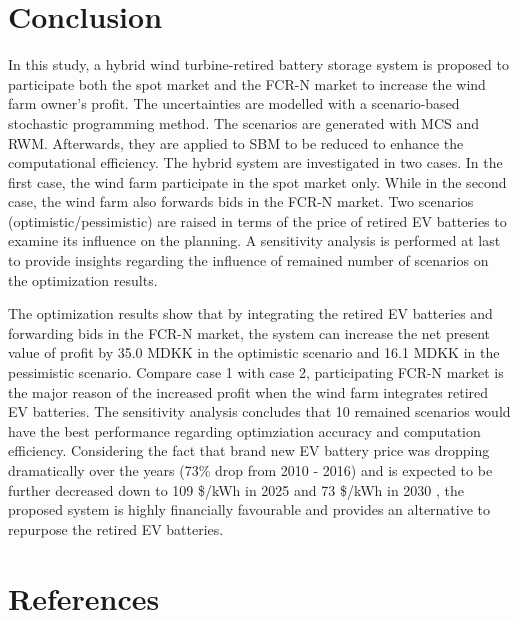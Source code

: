 \documentclass[final,5p,times,twocolumn,authoryear]{elsarticle}
\begin{document}
\section{Conclusion}
In this study, a hybrid wind turbine-retired battery storage system is proposed to participate both the spot market and the FCR-N market to increase the wind farm owner's profit. The uncertainties are modelled with a scenario-based stochastic programming method. The scenarios are generated with MCS and RWM. Afterwards, they are applied to SBM to be reduced to enhance the computational efficiency. The hybrid system are investigated in two cases. In the first case, the wind farm participate in the spot market only. While in the second case, the wind farm also forwards bids in the FCR-N market. Two scenarios (optimistic/pessimistic) are raised in terms of the price of retired EV batteries to examine its influence on the planning. A sensitivity analysis is performed at last to provide insights regarding the influence of remained number of scenarios on the optimization results.

The optimization results show that by integrating the retired EV batteries and forwarding bids in the FCR-N market, the system can increase the net present value of profit by 35.0 MDKK in the optimistic scenario and 16.1 MDKK in the pessimistic scenario. Compare case 1 with case 2, participating FCR-N market is the major reason of the increased profit when the wind farm integrates retired EV batteries. The sensitivity analysis concludes that 10 remained scenarios would have the best performance regarding optimziation accuracy and computation efficiency. Considering the fact that brand new EV battery price was dropping dramatically over the years (73\% drop from 2010 - 2016) \cite{BNEF2017} and is expected to be further decreased down to 109 \$/kWh in 2025 and 73 \$/kWh in 2030 \cite{BNEF2017}, the proposed system is highly financially favourable and provides an alternative to repurpose the retired EV batteries.





\section*{References}
 

\end{document}
